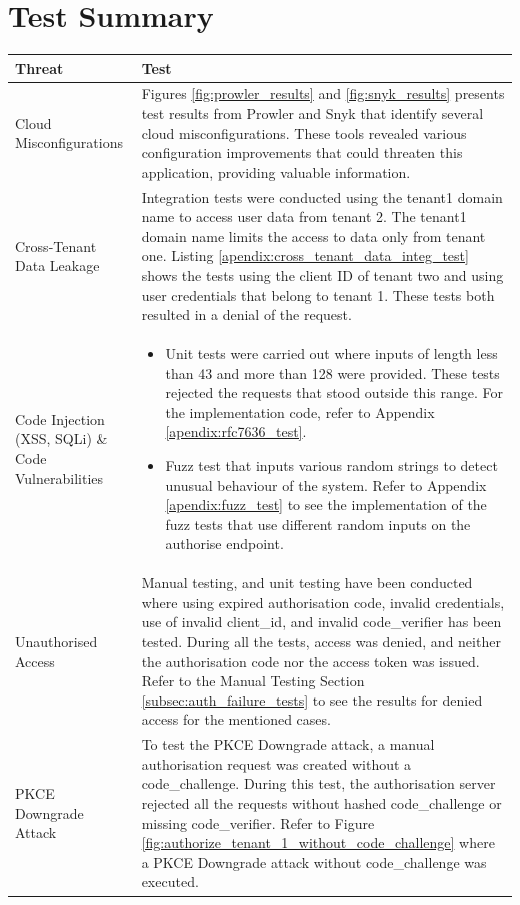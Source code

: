 \newpage
\section{Test Summary}
\begin{longtable}{|p{5cm}|p{10cm}|}
\hline
\rowcolor{grey!15}
\textbf{Threat} & \textbf{Test} \\
\hline
\endhead
\hline
\endfoot
Cloud Misconfigurations &  Figures \ref{fig:prowler_results} and \ref{fig:snyk_results} presents test results from Prowler and Snyk that identify several cloud misconfigurations. These tools revealed various configuration improvements that could threaten this application, providing valuable information. \\
\hline
Cross-Tenant Data Leakage & Integration tests were conducted using the tenant1 domain name to access user data from tenant 2. The tenant1 domain name limits the access to data only from tenant one. Listing \ref{apendix:cross_tenant_data_integ_test} shows the tests using the client ID of tenant two and using user credentials that belong to tenant 1. These tests both resulted in a denial of the request.\\
\hline
Code Injection (XSS, SQLi) \& Code Vulnerabilities & \begin{itemize}
    \item Unit tests were carried out where inputs of length less than 43 and more than 128 were provided. These tests rejected the requests that stood outside this range. For the implementation code, refer to Appendix \ref{apendix:rfc7636_test}.
    \item Fuzz test that inputs various random strings to detect unusual behaviour of the system. Refer to Appendix \ref{apendix:fuzz_test} to see the implementation of the fuzz tests that use different random inputs on the authorise endpoint.
\end{itemize}\\
\hline
 Unauthorised Access & Manual testing, and unit testing have been conducted where using expired authorisation code, invalid credentials, use of invalid client\_id, and invalid code\_verifier has been tested. During all the tests, access was denied, and neither the authorisation code nor the access token was issued. Refer to the Manual Testing Section \ref{subsec:auth_failure_tests} to see the results for denied access for the mentioned cases.\\
\hline
PKCE Downgrade Attack & To test the PKCE Downgrade attack, a manual authorisation request was created without a code\_challenge. During this test, the authorisation server rejected all the requests without hashed code\_challenge or missing code\_verifier. Refer to Figure \ref{fig:authorize_tenant_1_without_code_challenge} where a PKCE Downgrade attack without code\_challenge was executed.\\

\end{longtable}
